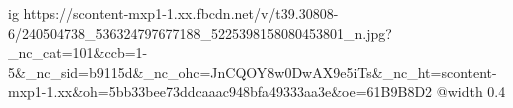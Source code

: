  
 
 
 
 

\ifcmt
  ig https://scontent-mxp1-1.xx.fbcdn.net/v/t39.30808-6/240504738_536324797677188_5225398158080453801_n.jpg?_nc_cat=101&ccb=1-5&_nc_sid=b9115d&_nc_ohc=JnCQOY8w0DwAX9e5iTs&_nc_ht=scontent-mxp1-1.xx&oh=5bb33bee73ddcaaac948bfa49333aa3e&oe=61B9B8D2
  @width 0.4
\fi
